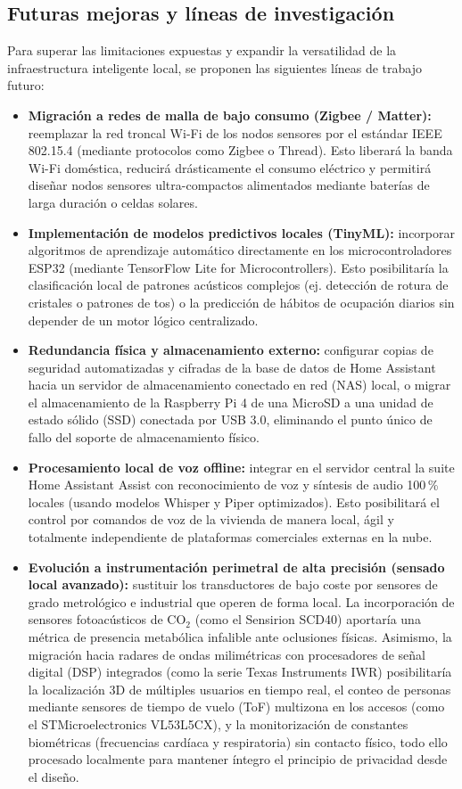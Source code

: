 \subsection{Futuras mejoras y líneas de investigación}

Para superar las limitaciones expuestas y expandir la versatilidad de la infraestructura inteligente local, se proponen las siguientes líneas de trabajo futuro:

\begin{itemize}
    \item \textbf{Migración a redes de malla de bajo consumo (Zigbee / Matter):} reemplazar la red troncal Wi-Fi de los nodos sensores por el estándar IEEE 802.15.4 (mediante protocolos como Zigbee o Thread). Esto liberará la banda Wi-Fi doméstica, reducirá drásticamente el consumo eléctrico y permitirá diseñar nodos sensores ultra-compactos alimentados mediante baterías de larga duración o celdas solares.
    \item \textbf{Implementación de modelos predictivos locales (TinyML):} incorporar algoritmos de aprendizaje automático directamente en los microcontroladores ESP32 (mediante TensorFlow Lite for Microcontrollers). Esto posibilitaría la clasificación local de patrones acústicos complejos (ej. detección de rotura de cristales o patrones de tos) o la predicción de hábitos de ocupación diarios sin depender de un motor lógico centralizado.
    \item \textbf{Redundancia física y almacenamiento externo:} configurar copias de seguridad automatizadas y cifradas de la base de datos de Home Assistant hacia un servidor de almacenamiento conectado en red (NAS) local, o migrar el almacenamiento de la Raspberry Pi 4 de una MicroSD a una unidad de estado sólido (SSD) conectada por USB 3.0, eliminando el punto único de fallo del soporte de almacenamiento físico.
    \item \textbf{Procesamiento local de voz offline:} integrar en el servidor central la suite Home Assistant Assist con reconocimiento de voz y síntesis de audio 100\,\% locales (usando modelos Whisper y Piper optimizados). Esto posibilitará el control por comandos de voz de la vivienda de manera local, ágil y totalmente independiente de plataformas comerciales externas en la nube.
    \item \textbf{Evolución a instrumentación perimetral de alta precisión (sensado local avanzado):} sustituir los transductores de bajo coste por sensores de grado metrológico e industrial que operen de forma local. La incorporación de sensores fotoacústicos de CO$_2$ (como el Sensirion SCD40) aportaría una métrica de presencia metabólica infalible ante oclusiones físicas. Asimismo, la migración hacia radares de ondas milimétricas con procesadores de señal digital (DSP) integrados (como la serie Texas Instruments IWR) posibilitaría la localización 3D de múltiples usuarios en tiempo real, el conteo de personas mediante sensores de tiempo de vuelo (ToF) multizona en los accesos (como el STMicroelectronics VL53L5CX), y la monitorización de constantes biométricas (frecuencias cardíaca y respiratoria) sin contacto físico, todo ello procesado localmente para mantener íntegro el principio de privacidad desde el diseño.

\end{itemize}
